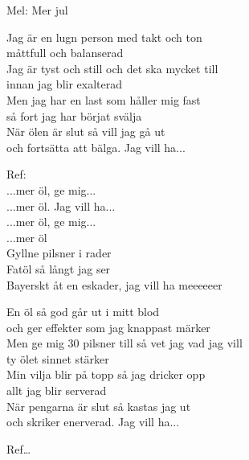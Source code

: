 \begin{SongText}[Mer öl]
    \begin{SongInfo}
        Mel: Mer jul
    \end{SongInfo}
    \begin{SongVerse}
        Jag är en lugn person med takt och ton\\%
        måttfull och balanserad\\%
        Jag är tyst och still och det ska mycket till\\%
        innan jag blir exalterad\\%
        Men jag har en last som håller mig fast\\%
        så fort jag har börjat svälja\\%
        När ölen är slut så vill jag gå ut\\%
        och fortsätta att bälga. Jag vill ha...
    \end{SongVerse}
    \begin{SongVerse}
        Ref:\\%
        ...mer öl, ge mig...\\%
        ...mer öl. Jag vill ha...\\%
        ...mer öl, ge mig...\\%
        ...mer öl\\%
        Gyllne pilsner i rader\\%
        Fatöl så långt jag ser\\%
        Bayerskt åt en eskader, jag vill ha meeeeeer
    \end{SongVerse}
    \begin{SongVerse}
        En öl så god går ut i mitt blod\\%
        och ger effekter som jag knappast märker\\%
        Men ge mig 30 pilsner till så vet jag vad jag vill\\%
        ty ölet sinnet stärker\\%
        Min vilja blir på topp så jag dricker opp\\%
        allt jag blir serverad\\%
        När pengarna är slut så kastas jag ut\\%
        och skriker enerverad. Jag vill ha...
    \end{SongVerse}
    \begin{SongVerse}
        Ref…
    \end{SongVerse}
    \begin{SongVerse}

\end{SongVerse}
\end{SongText}
